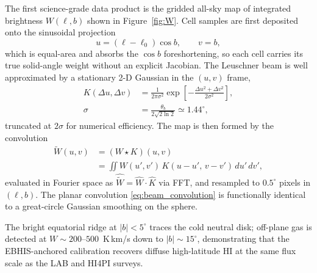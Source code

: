 \documentclass[10pt,preprint2]{aastex}
\begin{document}
The first science-grade data product is the gridded all-sky map of integrated brightness $W(\ell, b)$ shown in Figure~\ref{fig:W}. Cell samples are first deposited onto the sinusoidal projection
\begin{equation}
u = (\ell - \ell_0)\cos b, \qquad v = b,
\label{eq:sinusoidal}
\end{equation}
which is equal-area and absorbs the $\cos b$ foreshortening, so each cell carries its true solid-angle weight without an explicit Jacobian. The Leuschner beam is well approximated by a stationary 2-D Gaussian in the $(u,v)$ frame,
\begin{align}
K(\Delta u, \Delta v) &= \frac{1}{2\pi\sigma^2}\exp\!\left[-\frac{\Delta u^2 + \Delta v^2}{2\sigma^2}\right], \label{eq:beam_kernel}\\
\sigma &= \frac{\theta_b}{2\sqrt{2\ln 2}} \simeq 1.44^\circ,
\label{eq:beam_sigma}
\end{align}
truncated at $2\sigma$ for numerical efficiency. The map is then formed by the convolution
\begin{align}
\widetilde{W}(u, v) &= (W \star K)(u, v) \nonumber\\
&= \!\!\iint\!\! W(u', v')\,K(u-u',\,v-v')\,du'\,dv',
\label{eq:beam_convolution}
\end{align}
evaluated in Fourier space as $\widehat{\widetilde{W}} = \widehat{W}\cdot\widehat{K}$ via FFT, and resampled to $0.5^\circ$ pixels in $(\ell, b)$. The planar convolution \eqref{eq:beam_convolution} is functionally identical to a great-circle Gaussian smoothing on the sphere.

The bright equatorial ridge at $|b|<5^\circ$ traces the cold neutral disk; off-plane gas is detected at $W \sim 200$--$500$~K\,km/s down to $|b|\sim 15^\circ$, demonstrating that the EBHIS-anchored calibration recovers diffuse high-latitude HI at the same flux scale as the LAB and HI4PI surveys.
\end{document}
